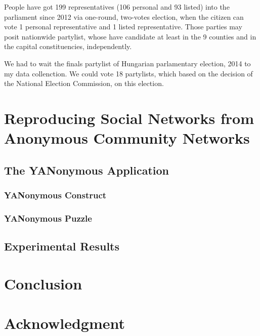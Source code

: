 \documentclass[journal]{IEEEtran}
\begin{document}
People have got 199 representatives (106 personal and 93 listed) into the parliament since 2012 via one-round, two-votes election, when the citizen can vote 1 personal representative and 1 listed representative. Those parties may posit nationwide partylist, whose have candidate at least in the 9 counties and in the capital constituencies, independently. 

We had to wait the finals partylist of Hungarian parlamentary election, 2014  to my  data collenction. We could vote 18 partylists, which based on the decision of the National Election Commission, on this election.


\section{Reproducing Social Networks from Anonymous Community Networks}

\subsection{The YANonymous Application}



\subsubsection{YANonymous Construct}

\subsubsection{YANonymous Puzzle}

\subsection{Experimental Results}

\section{Conclusion}

\section*{Acknowledgment}






\end{document}
